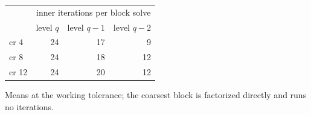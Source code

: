 {\small
\begin{tabular}{lrrr}
\toprule
& \multicolumn{3}{c}{inner iterations per block solve} \\
 & level $q$ & level $q-1$ & level $q-2$ \\
\midrule
cr 4 & 24 & 17 & 9 \\
cr 8 & 24 & 18 & 12 \\
cr 12 & 24 & 20 & 12 \\
\bottomrule
\end{tabular}
\par\smallskip
{\footnotesize Means at the working tolerance; the coarsest block is factorized directly and runs no iterations.}
}
